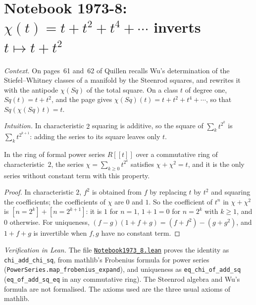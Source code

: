 \section[Notebook 1973-8: $t + t^2 + t^4 + \texorpdfstring{\cdots}{...}$ inverts $t + t^2$]{Notebook 1973-8: $\chi(t) = t + t^2 + t^4 + \cdots$ inverts $t \mapsto t + t^2$\protect{}}\label{sec:quillen-1973-8}

\emph{Context.} On pages~61 and~62 of  Quillen recalls Wu's determination of the Stiefel--Whitney classes of a manifold by the Steenrod squares, and rewrites it with the antipode $\chi(Sq)$ of the total square. On a class $t$ of degree one, $Sq(t) = t + t^2$, and the page gives $\chi(Sq)(t) = t + t^2 + t^4 + \cdots$, so that $Sq(\chi(Sq)\,t) = t$.

\emph{Intuition.} In characteristic $2$ squaring is additive, so the square of $\sum_k t^{2^k}$ is $\sum_k t^{2^{k+1}}$: adding the series to its square leaves only $t$.

\begin{encadre}
\begin{theoreme}\label{thm:quillen-1973-8}
In the ring of formal power series $R[[t]]$ over a commutative ring of characteristic~$2$, the series $\chi = \sum_{k \ge 0} t^{2^k}$ satisfies $\chi + \chi^2 = t$, and it is the only series without constant term with this property.
\end{theoreme}
\end{encadre}

\begin{proof}
In characteristic $2$, $f^2$ is obtained from $f$ by replacing $t$ by $t^2$ and squaring the coefficients; the coefficients of $\chi$ are $0$ and $1$. So the coefficient of $t^n$ in $\chi + \chi^2$ is $[n = 2^k] + [n = 2^{k+1}]$: it is $1$ for $n = 1$, $1 + 1 = 0$ for $n = 2^{k}$ with $k \ge 1$, and $0$ otherwise. For uniqueness, $(f - g)(1 + f + g) = (f + f^2) - (g + g^2)$, and $1 + f + g$ is invertible when $f, g$ have no constant term.
\end{proof}

\emph{Verification in Lean.} The file \href{\leanblobmain/Notebook1973_8.lean}{\texttt{Notebook1973\_8.\allowbreak{}lean}} proves the identity as \texttt{chi\_add\_chi\_sq}, from mathlib's Frobenius formula for power series (\texttt{PowerSeries.map\_frobenius\_expand}), and uniqueness as \texttt{eq\_chi\_of\_add\_sq} (\texttt{eq\_of\_add\_sq\_eq} in any commutative ring). The Steenrod algebra and Wu's formula are not formalised. The axioms used are the three usual axioms of mathlib.

